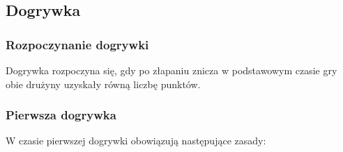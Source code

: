 \documentclass[12pt]{article}
\begin{document}
\subsection{Dogrywka}

\subsubsection{Rozpoczynanie dogrywki}
Dogrywka rozpoczyna się, gdy
po złapaniu znicza w podstawowym czasie gry obie drużyny uzyskały równą
liczbę punktów.

\subsubsection{Pierwsza dogrywka}
W czasie pierwszej dogrywki
obowiązują następujące zasady:
\end{document}
